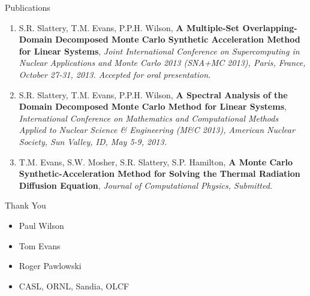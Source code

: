 \documentclass{beamer}
\begin{document}
\begin{frame}{Publications}

  \small{
    \begin{enumerate}
    \item S.R. Slattery, T.M. Evans, P.P.H. Wilson, \textbf{A
      Multiple-Set Overlapping-Domain Decomposed Monte Carlo Synthetic
      Acceleration Method for Linear Systems}, \textit{Joint
      International Conference on Supercomputing in Nuclear
      Applications and Monte Carlo 2013 (SNA+MC 2013), Paris, France,
      October 27-31, 2013. Accepted for oral presentation.}
      \medskip
    \item S.R. Slattery, T.M. Evans, P.P.H. Wilson, \textbf{A Spectral
      Analysis of the Domain Decomposed Monte Carlo Method for Linear
      Systems}, \textit{International Conference on Mathematics and
      Computational Methods Applied to Nuclear Science \& Engineering
      (M\&C 2013), American Nuclear Society, Sun Valley, ID, May 5-9,
      2013.}
      \medskip
    \item T.M. Evans, S.W. Mosher, S.R. Slattery, S.P. Hamilton,
      \textbf{A Monte Carlo Synthetic-Acceleration Method for Solving
        the Thermal Radiation Diffusion Equation}, \textit{Journal of
        Computational Physics, Submitted.}
    \end{enumerate}
  }
\end{frame}

\begin{frame}{Thank You}

  \begin{itemize}
  \item Paul Wilson
  \item Tom Evans
  \item Roger Pawlowski
  \item CASL, ORNL, Sandia, OLCF
  \end{itemize}

\end{frame}

\end{document}
